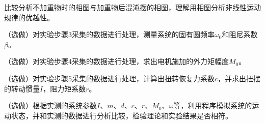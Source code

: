 \documentclass[dvipsnames, svgnames,a4paper,11pt]{article}
\newcommand{\recordblank}[1]{\par\vspace*{#1}\par}
\begin{document}
\begin{question}
比较分析不加重物时的相图与加重物后混沌摆的相图，理解用相图分析非线性运动规律的优越性。
\end{question}
\recordblank{4cm}

\begin{question}
（选做）对实验步骤3采集的数据进行处理，测量系统的固有圆频率$\omega_0$和阻尼系数$\beta$。
\end{question}
\recordblank{4cm}

\begin{question}
（选做）对实验步骤4采集的数据进行处理，求出电机施加的外力矩幅度$M_0$。
\end{question}
\recordblank{4cm}

\begin{question}
（选做）对实验步骤5采集的数据进行处理，计算出扭转恢复力系数$c$，并求出扭摆的转动惯量$I$，阻力矩系数$r$。
\end{question}
\recordblank{4cm}

\begin{question}
（选做）根据实测的系统参数$I$、$m$、$d$、$c$、$r$、$M_0$、$\omega$等，利用程序模拟系统的运动状态，并和实测的数据进行分析比较，检验理论和实验结果是否相符。
\end{question}
\recordblank{4cm}



\appendix
\appendixpage
\addappheadtotoc


\recordblank{7cm}


\recordblank{7cm}
\end{document}
